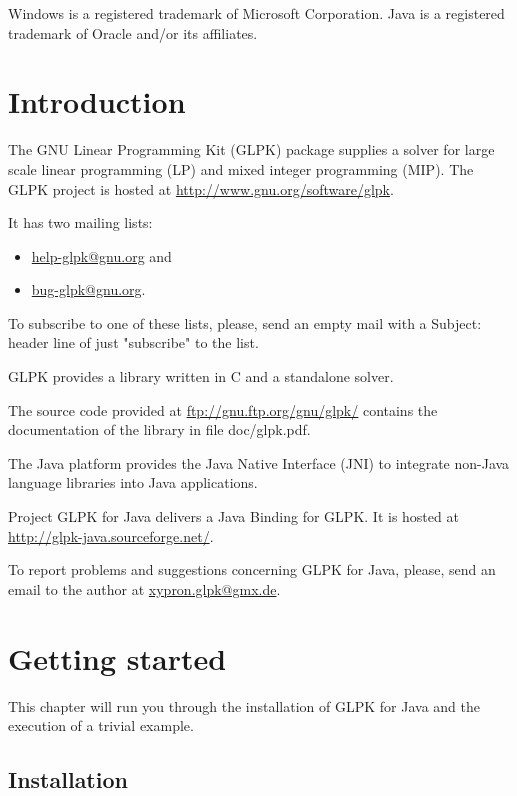 \documentclass[a4paper,11pt]{report}
\begin{document}
\medskip \noindent
Windows is a registered trademark of Microsoft Corporation. 
Java is a registered trademark of Oracle and/or its affiliates.

\tableofcontents

\chapter{Introduction}
The GNU Linear Programming Kit (GLPK)\cite{GLPK} package supplies a solver for
large scale linear programming (LP) and mixed integer programming (MIP). The
GLPK project is hosted at
\linebreak\href{http://www.gnu.org/software/glpk}{http://www.gnu.org/software/glpk}.

It has two mailing lists:
\begin{itemize}
\item\href{mailto:help-glpk@gnu.org}{help-glpk@gnu.org} and 
\item\href{mailto:bug-glpk@gnu.org}{bug-glpk@gnu.org}.
\end{itemize}
To subscribe to one of these lists, please, send an empty mail with a Subject:
header line of just "subscribe" to the list.

GLPK provides a library written in C and a standalone solver.

The source code provided at
\href{ftp://gnu.ftp.org/gnu/glpk/}{ftp://gnu.ftp.org/gnu/glpk/} contains the
documentation of the library in  file doc/glpk.pdf.

The Java platform provides the Java Native Interface (JNI)\cite{JNI} to
integrate non-Java language libraries into Java applications.

Project GLPK for Java delivers a Java Binding for GLPK. It is hosted at
\linebreak\href{http://glpk-java.sourceforge.net/}{http://glpk-java.sourceforge.net/}.

To report problems and suggestions concerning GLPK for Java, please, send an
email to the author at \href{mailto:xypron.glpk@gmx.de}{xypron.glpk@gmx.de}.

\chapter{Getting started}

This chapter will run you through the installation of GLPK for Java and the
execution of a trivial example.

\section{Installation}
\end{document}
